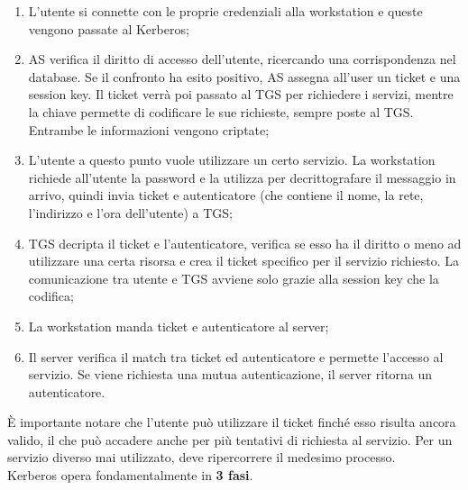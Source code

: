 \begin{enumerate}
    \item L’utente si connette con le proprie credenziali alla workstation e
          queste vengono passate al Kerberos;
    \item AS verifica il diritto di accesso dell’utente, ricercando una
          corrispondenza nel database. Se il confronto ha esito positivo, AS
          assegna all’user un ticket e una session key.
          Il ticket verrà poi passato al TGS per richiedere i servizi, mentre
          la chiave permette di codificare le sue richieste, sempre poste al TGS.
          Entrambe le informazioni vengono criptate;
    \item L’utente a questo punto vuole utilizzare un certo servizio.
          La workstation richiede all'utente la password e la utilizza per
          decrittografare il messaggio in arrivo, quindi invia ticket e
          autenticatore
          (che contiene il nome, la rete, l'indirizzo e l'ora dell'utente) a TGS;
    \item TGS decripta il ticket e l'autenticatore, verifica se esso ha il
          diritto o meno ad utilizzare una certa risorsa e crea il ticket
          specifico per il servizio richiesto. La comunicazione tra utente e
          TGS avviene solo grazie alla session key che la codifica;
    \item La workstation manda ticket e autenticatore al server;
    \item Il server verifica il match tra ticket ed autenticatore e permette
          l’accesso al servizio. Se
          viene richiesta una mutua autenticazione, il server ritorna un
          autenticatore.
\end{enumerate}

È importante notare che l’utente può utilizzare il ticket finché esso risulta
ancora valido, il che può accadere anche per più tentativi di richiesta al servizio.
Per un servizio diverso mai utilizzato, deve ripercorrere il medesimo processo.\\

Kerberos opera fondamentalmente in \textbf{3 fasi}.

